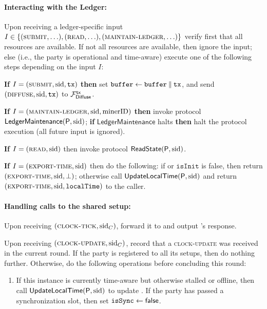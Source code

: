 \begin{cccProtocol}
    \paragraph{Interacting with the Ledger:}
    Upon receiving a ledger-specific input $I \in \{(\textsc{submit}, \ldots), \allowbreak (\textsc{read}, \ldots), \allowbreak (\textsc{maintain-ledger}, \ldots) \}$ verify first that all resources are available.
    If not all resources are available, then ignore the input; else (i.e., the party is operational and time-aware) execute one of the following steps depending on the input $I$:
    \begin{cccItemize}[nosep]
        \item \textbf{If} $I = (\textsc{submit}, \mathrm{sid}, \mathtt{tx})$ \textbf{then} set $\mathtt{buffer} \gets \mathtt{buffer} \mathbin\Vert \mathtt{tx}$, and send $(\textsc{diffuse}, \mathrm{sid}, \mathtt{tx})$ to $\mathcal{F}_{\textsf{Diffuse}}^{\textsf{tx}}$.

        \item \textbf{If} $I = (\textsc{maintain-ledger}, \mathrm{sid}, \mathrm{minerID})$ \textbf{then} invoke protocol $\mathsf{LedgerMaintenance}(\mathsf{P}, \mathrm{sid})$; \textbf{if} $\mathsf{LedgerMaintenance}$ halts \textbf{then} halt the protocol execution (all future input is ignored).

        \item \textbf{If} $I = (\textsc{read}, \mathrm{sid})$ then invoke protocol $\mathsf{ReadState}(\mathsf{P}, \mathrm{sid})$.

        \item \textbf{If} $I = (\textsc{export-time}, \mathrm{sid})$ then do the following: if \isSync or $\mathtt{isInit}$ is false, then return $(\textsc{export-time}, \mathrm{sid}, \bot)$; otherwise call $\mathsf{UpdateLocalTime}(\mathsf{P}, \mathrm{sid})$ and return $(\textsc{export-time}, \mathrm{sid}, \mathtt{localTime})$ to the caller.
    \end{cccItemize}

    \paragraph{Handling calls to the shared setup:}
    \begin{cccItemize}[nosep]
        \item Upon receiving $(\textsc{clock-tick}, \mathrm{sid}_C)$, forward it to \funcDriftingClock and output \funcDriftingClock's response.

        \item Upon receiving $(\textsc{clock-update}, \mathrm{sid}_C)$, record that a \textsc{clock-update} was received in the current round.
        If the party is registered to all its setups, then do nothing further.
        Otherwise, do the following operations before concluding this round:
        \begin{enumerate}[label=\arabic*,leftmargin=*, nosep]
            \item If this instance is currently time-aware but otherwise stalled or offline, then call $\mathsf{UpdateLocalTime}(\mathsf{P}, \mathrm{sid})$ to update \localTime.
                  If the party has passed a synchronization slot, then set $\mathtt{isSync} \gets \mathsf{false}$.


\end{enumerate}
\end{cccItemize}
\end{cccProtocol}

